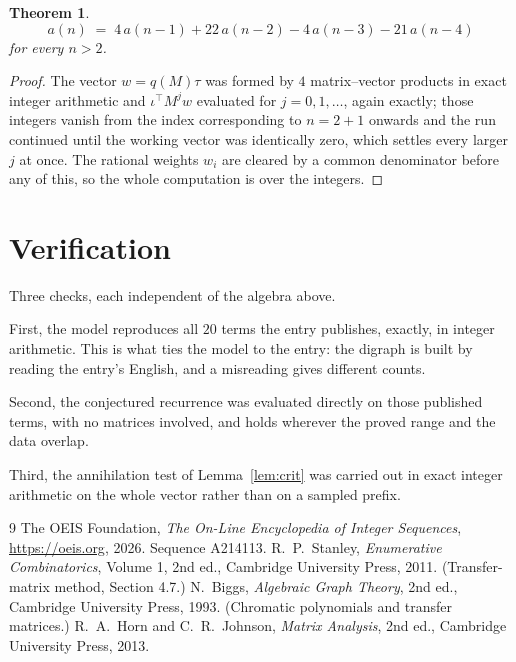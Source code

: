 \documentclass[11pt,a4paper]{article}
\theoremstyle{plain}
\newtheorem{theorem}{Theorem}
\theoremstyle{definition}
\begin{document}
\begin{theorem}
\[
a(n)\;=\;4\,a(n-1) + 22\,a(n-2) - 4\,a(n-3) - 21\,a(n-4)
\]
for every $n>2$.
\end{theorem}

\begin{proof}
The vector $w=q(M)\tau$ was formed by $4$ matrix--vector products in exact integer
arithmetic and $\iota^{\!\top}M^{j}w$ evaluated for $j=0,1,\dots$, again exactly; those
integers vanish from the index corresponding to $n=2+1$ onwards and the run continued
until the working vector was identically zero, which settles every larger $j$ at once. The
rational weights $w_i$ are cleared by a common denominator before any of this, so the whole
computation is over the integers.
\end{proof}

\section{Verification}

Three checks, each independent of the algebra above.

First, the model reproduces all $20$ terms the entry publishes, exactly, in integer
arithmetic. This is what ties the model to the entry: the digraph is built by reading the
entry's English, and a misreading gives different counts.

Second, the conjectured recurrence was evaluated directly on those published terms, with no
matrices involved, and holds wherever the proved range and the data overlap.

Third, the annihilation test of Lemma~\ref{lem:crit} was carried out in exact integer
arithmetic on the whole vector rather than on a sampled prefix.

\begin{thebibliography}{9}
 The OEIS Foundation, \emph{The On-Line Encyclopedia of Integer
Sequences}, \url{https://oeis.org}, 2026. Sequence A214113.
 R.~P.~Stanley, \emph{Enumerative Combinatorics}, Volume 1, 2nd ed.,
Cambridge University Press, 2011. (Transfer-matrix method, Section 4.7.)
 N.~Biggs, \emph{Algebraic Graph Theory}, 2nd ed., Cambridge University
Press, 1993. (Chromatic polynomials and transfer matrices.)
 R.~A.~Horn and C.~R.~Johnson, \emph{Matrix Analysis}, 2nd ed., Cambridge
University Press, 2013.
\end{thebibliography}
\end{document}
